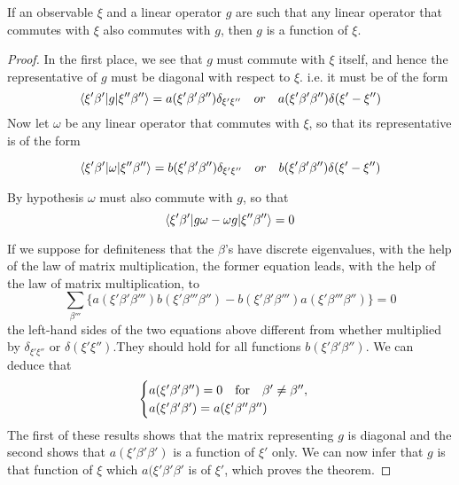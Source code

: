 \begin{theorem}
If an observable $\xi$ and a linear operator $g$ are such that any linear operator that commutes with $\xi$ also commutes with $g$, then $g$ is a function of $\xi$.
\end{theorem}

\begin{proof}
In the first place, we see that $g$ must commute with $\xi$ itself, and hence the representative of $g$ must be diagonal with respect to $\xi$. i.e. it must be of the form
\begin{equation}
\langle \xi'\beta' | g | \xi''\beta'' \rangle=a(\xi'\beta'\beta'')\delta_{\xi'\xi''}\quad or \quad a(\xi'\beta'\beta'')\delta(\xi'-\xi'')
\end{equation}
Now let $\omega$ be any linear operator that commutes with $\xi$, so that its representative is of the form


\begin{equation}
\langle \xi'\beta' | \omega | \xi''\beta'' \rangle=b(\xi'\beta'\beta'')\delta_{\xi'\xi''}\quad or \quad b(\xi'\beta'\beta'')\delta(\xi'-\xi'')
\end{equation}

By hypothesis $\omega$ must also commute with $g$, so that 
\begin{equation}
\langle \xi'\beta' | g\omega-\omega g | \xi''\beta'' \rangle=0
\end{equation}

If we suppose for definiteness that the $\beta$'s have discrete eigenvalues, with the help of the law of matrix multiplication, the former equation leads, with the help of the law of matrix multiplication, to
\begin{equation}
\sum_{\beta'''} \{a (\xi' \beta' \beta''' )b(\xi'\beta'''\beta'')-b(\xi' \beta' \beta''' )a(\xi'\beta'''\beta'')\}=0
\end{equation}
the left-hand sides of the two equations above different from whether multiplied by $\delta_{\xi'\xi''}$ or $\delta(\xi' \xi'') $.They should hold for all functions $b(\xi'\beta'\beta'')$. We can deduce that
\begin{equation}
\begin{cases}
a(\xi'\beta' \beta'') =0 \quad \text{for} \quad \beta' \neq \beta'',\\
a(\xi'\beta'\beta')=a(\xi'\beta''\beta'')
\end{cases}
\end{equation}
The first of these results shows that the matrix representing $g$ is diagonal and the second shows that $a(\xi'\beta' \beta')$ is a function of $\xi'$ only. We can now infer that $g$ is that function of $\xi$ which $a(\xi'\beta' \beta'$ is of $\xi'$, which proves the theorem.
\end{proof}

